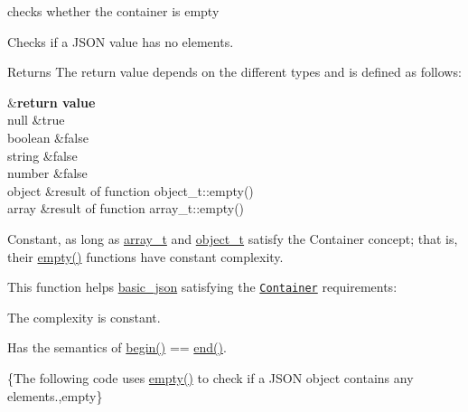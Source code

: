 checks whether the container is empty 

Checks if a J\-S\-O\-N value has no elements.

\begin{DoxyReturn}{Returns}
The return value depends on the different types and is defined as follows\-: \begin{TabularC}{2}
\hline
{}&{\bf return value  }\\
null &{\ttfamily true} \\
boolean &{\ttfamily false} \\
string &{\ttfamily false} \\
number &{\ttfamily false} \\
object &result of function {\ttfamily object\-\_\-t\-::empty()} \\
array &result of function {\ttfamily array\-\_\-t\-::empty()} \\
\end{TabularC}
Constant, as long as \hyperlink{classnlohmann_1_1basic__json_ab00b882d39306d663c23dab110f5cae0}{array\-\_\-t} and \hyperlink{classnlohmann_1_1basic__json_a0ac9894c9de8dc551cf2e5f1c605537f}{object\-\_\-t} satisfy the Container concept; that is, their {\ttfamily \hyperlink{classnlohmann_1_1basic__json_ae3fe0423252e171973cdd5786d036e30}{empty()}} functions have constant complexity.
\end{DoxyReturn}
This function helps {\ttfamily \hyperlink{classnlohmann_1_1basic__json}{basic\-\_\-json}} satisfying the \href{http://en.cppreference.com/w/cpp/concept/Container}{\tt Container} requirements\-:
\begin{DoxyItemize}
\item The complexity is constant.
\item Has the semantics of {\ttfamily \hyperlink{classnlohmann_1_1basic__json_ad4e381c54039607be08d7af41a1f6ad1}{begin()} == \hyperlink{classnlohmann_1_1basic__json_a12ccf14d39ddae52f6c7e126105a230b}{end()}}.
\end{DoxyItemize}

\{The following code uses {\ttfamily \hyperlink{classnlohmann_1_1basic__json_ae3fe0423252e171973cdd5786d036e30}{empty()}} to check if a J\-S\-O\-N object contains any elements.,empty\}

